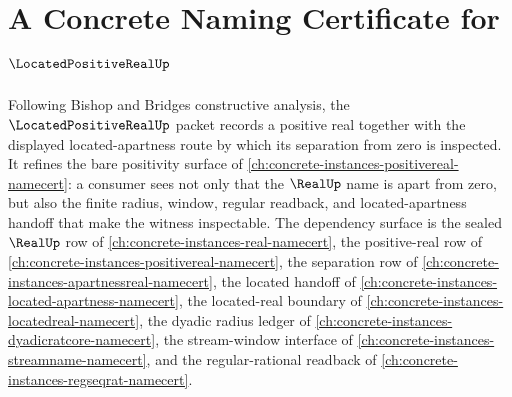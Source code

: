 \chapter{A Concrete Naming Certificate for $\LocatedPositiveRealUp$}
\label{ch:concrete-instances-located-positive-real-namecert}

Following Bishop and Bridges constructive analysis, the $\LocatedPositiveRealUp$ packet records a positive real together with the displayed located-apartness route by which its separation from zero is inspected. It refines the bare positivity surface of \autoref{ch:concrete-instances-positivereal-namecert}: a consumer sees not only that the $\RealUp$ name is apart from zero, but also the finite radius, window, regular readback, and located-apartness handoff that make the witness inspectable. The dependency surface is the sealed $\RealUp$ row of \autoref{ch:concrete-instances-real-namecert}, the positive-real row of \autoref{ch:concrete-instances-positivereal-namecert}, the separation row of \autoref{ch:concrete-instances-apartnessreal-namecert}, the located handoff of \autoref{ch:concrete-instances-located-apartness-namecert}, the located-real boundary of \autoref{ch:concrete-instances-locatedreal-namecert}, the dyadic radius ledger of \autoref{ch:concrete-instances-dyadicratcore-namecert}, the stream-window interface of \autoref{ch:concrete-instances-streamname-namecert}, and the regular-rational readback of \autoref{ch:concrete-instances-regseqrat-namecert}.

